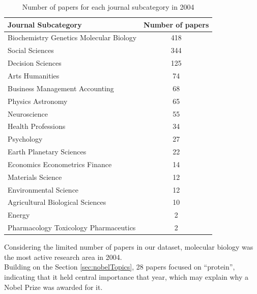 \documentclass{article}
\begin{document}
\begin{table}[H]
	\centering
	\begin{tabular}{|l|c|}
		\hline
		\textbf{Journal Subcategory}            & \textbf{Number of papers} \\ \hline
		Biochemistry Genetics Molecular Biology & 418                       \\ \hline
		Social Sciences                         & 344                       \\ \hline
		Decision Sciences                       & 125                       \\ \hline
		Arts Humanities                         & 74                        \\ \hline
		Business Management Accounting          & 68                        \\ \hline
		Physics Astronomy                       & 65                        \\ \hline
		Neuroscience                            & 55                        \\ \hline
		Health Professions                      & 34                        \\ \hline
		Psychology                              & 27                        \\ \hline
		Earth Planetary Sciences                & 22                        \\ \hline
		Economics Econometrics Finance          & 14                        \\ \hline
		Materials Science                       & 12                        \\ \hline
		Environmental Science                   & 12                        \\ \hline
		Agricultural Biological Sciences        & 10                        \\ \hline
		Energy                                  & 2                         \\ \hline
		Pharmacology Toxicology Pharmaceutics   & 2                         \\ \hline
	\end{tabular}
	\caption{Number of papers for each journal subcategory in 2004}
	\label{tab:papersPerSubcategoryPerYear}
\end{table}
Considering the limited number of papers in our dataset, molecular biology
was the most active research area in 2004.\\
Building on the Section \ref{sec:nobelTopics}, 28 papers
focused on ``protein'', indicating that it held central importance that year,
which may explain why a Nobel Prize was awarded for it.
\end{document}
